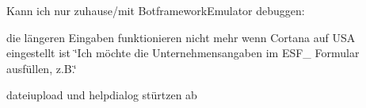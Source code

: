Kann ich nur zuhause/mit Botframework\+Emulator debuggen\+:
\begin{DoxyItemize}
\item die längeren Eingaben funktionieren nicht mehr wenn Cortana auf U\+SA eingestellt ist \char`\"{}\+Ich möchte die Unternehmensangaben im E\+S\+F\+\_ Formular ausfüllen, z.\+B.\char`\"{}
\item dateiupload und helpdialog stürtzen ab 
\end{DoxyItemize}